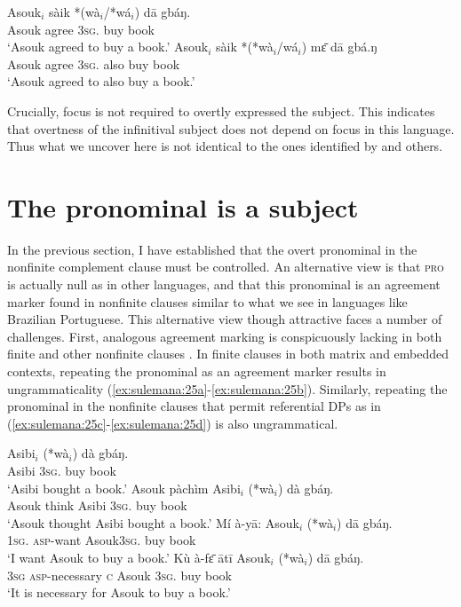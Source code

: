 \documentclass[output=paper,colorlinks,citecolor=brown]{langscibook}
\begin{document}
\ea%
    \label{ex:sulemana:24}
    \ea%
    \label{ex:sulemana:24a} 
    \gll    Asouk$_i$ sàik *(wà$_i$/*wá$_i$) dā gbáŋ. \\
            Asouk agree \textsc{3sg}.  buy book\\
    \glt    `Asouk agreed to buy a book.'
    \ex%
    \label{ex:sulemana:24b} 
    \gll    Asouk$_i$ sàik *(*wà$_i$/wá$_i$) mɛ̄ dā gbá.ŋ \\
            Asouk agree \textsc{3sg}. also  buy book\\
    \glt    `Asouk agreed to also buy a book.'
    \z
\z

Crucially, focus is not required to overtly expressed the subject. This indicates that overtness of the infinitival subject does not depend on focus in this language. Thus what we uncover here is not identical to the ones identified by \citet{Szabolcsi2009} and others. 

\section{The pronominal is a subject}\label{sec:sulemana:5}

In the previous section, I have established that the overt pronominal in the nonfinite complement clause must be controlled. An alternative view is that \textsc{pro} is actually null as in other languages, and that this pronominal is an agreement marker found in nonfinite clauses similar to what we see in languages like Brazilian Portuguese. This alternative view though attractive faces a number of challenges.
First, analogous agreement marking is conspicuously lacking in both finite and other nonfinite clauses . In finite clauses in both matrix and embedded contexts, repeating the pronominal as an agreement marker results in ungrammaticality (\ref{ex:sulemana:25a}-\ref{ex:sulemana:25b}). 
Similarly, repeating the pronominal in the nonfinite clauses that permit referential DPs as in (\ref{ex:sulemana:25c}-\ref{ex:sulemana:25d}) is also ungrammatical. 

\ea%
    \label{ex:sulemana:25}
    \ea%
    \label{ex:sulemana:25a}
    \gll    Asibi$_i$  (*wà$_i$) dà gbáŋ. \\
            Asibi  \textsc{3sg}. buy book\\
    \glt    `Asibi bought a book.'
    \ex%
    \label{ex:sulemana:25b}
    \gll    Asouk pàchìm Asibi$_i$ (*wà$_i$) dà gbáŋ. \\
            Asouk think Asibi   \textsc{3sg}. buy book\\
    \glt    `Asouk thought Asibi bought a book.'
    \ex%
    \label{ex:sulemana:25c}
    \gll    Mí à-yā: Asouk$_i$ (*wà$_i$) dā gbáŋ. \\
            \textsc{1sg}. \textsc{asp}-want Asouk\textsc{3sg}. buy book\\
    \glt    `I want Asouk to buy a book.'
    \ex%
    \label{ex:sulemana:25d}
    \gll    Kù à-fɛ̄ ātī Asouk$_i$ (*wà$_i$) dā gbáŋ. \\
            \textsc{3sg} \textsc{asp}-necessary \textsc{c} Asouk \textsc{3sg}. buy book\\
    \glt    `It is necessary for Asouk to buy a book.' 
    \z
\z
\end{document}
